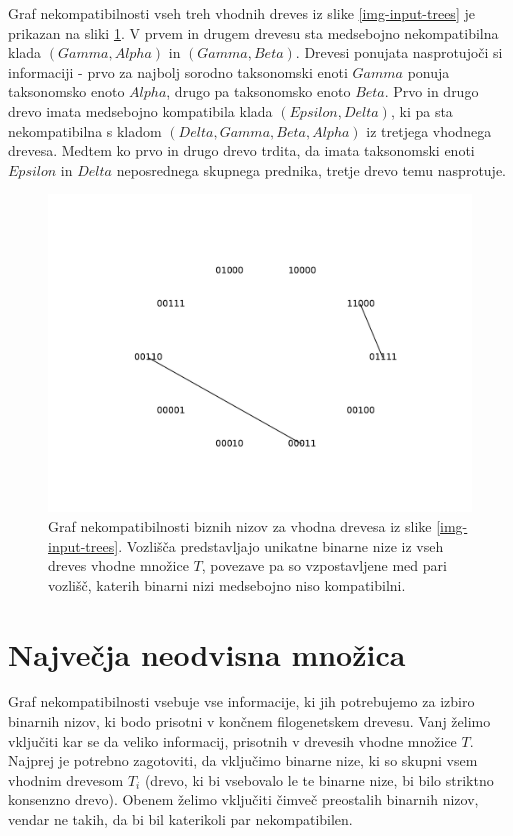 \documentclass[a4paper, 12pt]{book}
\begin{document}
Graf nekompatibilnosti vseh treh vhodnih dreves iz slike \ref{img-input-trees} je prikazan na sliki \ref{img-incompat-graph-example}. V prvem in drugem drevesu sta medsebojno nekompatibilna klada $(Gamma, Alpha)$ in $(Gamma, Beta)$. Drevesi ponujata nasprotujoči si informaciji - prvo za najbolj sorodno taksonomski enoti $Gamma$ ponuja taksonomsko enoto $Alpha$, drugo pa taksonomsko enoto $Beta$. Prvo in drugo drevo imata medsebojno kompatibila klada $(Epsilon, Delta)$, ki pa sta nekompatibilna s kladom $(Delta, Gamma, Beta, Alpha)$ iz tretjega vhodnega drevesa. Medtem ko prvo in drugo drevo trdita, da imata taksonomski enoti $Epsilon$ in $Delta$ neposrednega skupnega prednika, tretje drevo temu nasprotuje.

\begin{figure}
	\begin{center}
		\includegraphics[scale=0.7, clip=true, trim=2cm 2cm 2cm 2cm]{gfx/incompat_graph.pdf}
	\end{center}
	\caption{Graf nekompatibilnosti biznih nizov za vhodna drevesa iz slike \ref{img-input-trees}. Vozlišča predstavljajo unikatne binarne nize iz vseh dreves vhodne množice $T$, povezave pa so vzpostavljene med pari vozlišč, katerih binarni nizi medsebojno niso kompatibilni.}
	\label{img-incompat-graph-example}
\end{figure}

\section{Največja neodvisna množica}
Graf nekompatibilnosti vsebuje vse informacije, ki jih potrebujemo za izbiro binarnih nizov, ki bodo prisotni v končnem filogenetskem drevesu. Vanj želimo vključiti kar se da veliko informacij, prisotnih v drevesih vhodne množice $T$. Najprej je potrebno zagotoviti, da vključimo binarne nize, ki so skupni vsem vhodnim drevesom $T_i$ (drevo, ki bi vsebovalo le te binarne nize, bi bilo striktno konsenzno drevo). Obenem želimo vključiti čimveč preostalih binarnih nizov, vendar ne takih, da bi bil katerikoli par nekompatibilen. 
\end{document}
